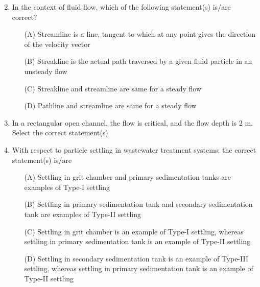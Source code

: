 \documentclass[journal]{IEEEtran}
\numberwithin{equation}{enumi}
\numberwithin{figure}{enumi}
\begin{document}
\begin{enumerate}[start=1, label={Q\arabic*.}]
\begin{enumerate}[label=(\Alph*)]
\begin{multicols}{2}
  \end{multicols}
  \end{enumerate}
\item In the context of fluid flow, which of the following statement(s) is/are correct? 
\vspace{0.2cm}
\begin{itemize}
  \item[(A)] Streamline is a line, tangent to which at any point gives the direction of the
velocity vector
  \item[(B)] Streakline is the actual path traversed by a given fluid particle in an unsteady flow
  \item[(C)] Streakline and streamline are same for a steady flow
  \item[(D)] Pathline and streamline are same for a steady flow
  \end{itemize}
\item In a rectangular open channel, the flow is critical, and the flow depth is $2$ m. Select the
correct statement(s)
 \begin{enumerate}[label=(\Alph*)]
  \end{enumerate}
\item With respect to particle settling in wastewater treatment systems; the correct statement(s)
is/are
 \vspace{0.2cm}
\begin{itemize}
  \item[(A)] Settling in grit chamber and primary sedimentation tanks are examples of Type-I settling
  \item[(B)] Settling in primary sedimentation tank and secondary sedimentation tank are examples of
Type-II settling
  \item[(C)] Settling in grit chamber is an example of Type-I settling, whereas settling in primary
sedimentation tank is an example of Type-II settling
  \item[(D)] Settling in secondary sedimentation tank is an example of Type-III settling, whereas
settling in primary sedimentation tank is an example of Type-II settling

\end{itemize}
\end{enumerate}
\end{document}
